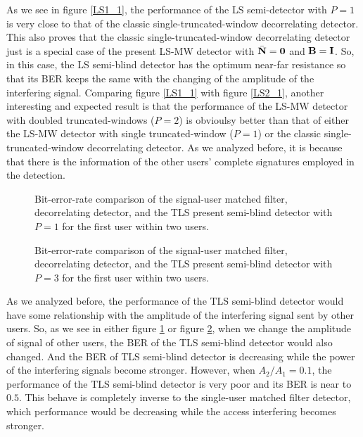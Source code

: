 \documentclass[a4paper,11pt,fleqn]{article}
\newcommand{\bN}{{\bf N}}
\newcommand{\bI}{{\bf I}}
\newcommand{\bB}{{\bf B}}
\begin{document}
As we see in figure \ref{LS1_1}, the performance of the LS
semi-detector with $P=1$ is very close to that of the classic
single-truncated-window decorrelating detector. This also proves
that the classic single-truncated-window decorrelating detector
just is a special case of the present LS-MW detector with
$\bar{\bN} = \mathbf{0}$ and $\bB=\bI$. So, in this case, the LS
semi-blind detector has the optimum near-far resistance so that
its BER keeps the same with the changing of the amplitude of the
interfering signal. Comparing figure \ref{LS1_1} with figure
\ref{LS2_1}, another interesting and expected result is that the
performance of the LS-MW detector with doubled truncated-windows
($P=2$) is obvioulsy better than that of either the LS-MW detector
with single truncated-window ($P=1$) or the classic
single-truncated-window decorrelating detector. As we analyzed
before, it is because that there is the information of the other
users' complete signatures employed in the detection.

\begin{figure}
\caption{Bit-error-rate comparison of the signal-user matched
filter, decorrelating detector, and the TLS present semi-blind
detector with $P=1$ for the first user within two users.}
\label{TLS1_1}
\end{figure}

\begin{figure}
\caption{Bit-error-rate comparison of the signal-user matched
filter, decorrelating detector, and the TLS present semi-blind
detector with $P=3$ for the first user within two users.}
\label{TLS2_1}
\end{figure}

As we analyzed before, the performance of the TLS semi-blind
detector would have some relationship with the amplitude of the
interfering signal sent by other users. So, as we see in either
figure \ref{TLS1_1} or figure \ref{TLS2_1}, when we change the
amplitude of signal of other users, the BER of the TLS semi-blind
detector would also changed. And the BER of TLS semi-blind
detector is decreasing while the power of the interfering signals
become stronger. However, when $A_2/A_1=0.1$, the performance of
the TLS semi-blind detector is very poor and its BER is near to
$0.5$. This behave is completely inverse to the single-user
matched filter detector, which performance would be decreasing
while the access interfering becomes stronger.
\end{document}
